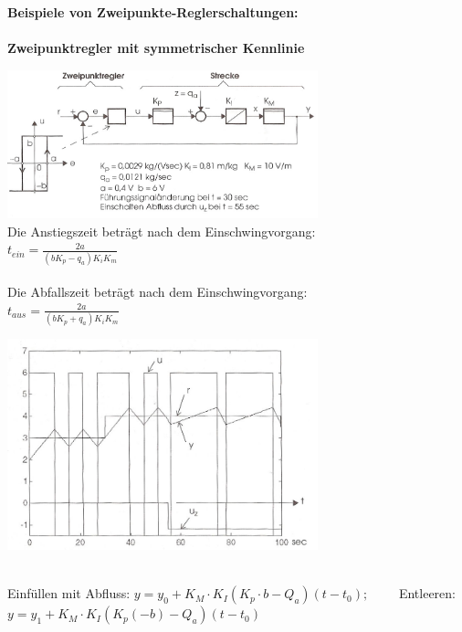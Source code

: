 	\textbf{Beispiele von Zweipunkte-Reglerschaltungen:}\\ \\
		\textbf{Zweipunktregler mit symmetrischer Kennlinie } \\
		\begin{minipage}{9cm}
			\vspace{.5cm}        
	 		\includegraphics[width=9cm]{./bilder/Zweipunktregler-b+b2.jpg}\\
			Die Anstiegszeit beträgt nach dem Einschwingvorgang:\\
			$t_{ein}=\frac{2a}{(b K_p - q_a)K_i K_m}$ \\ \\
			Die Abfallszeit beträgt nach dem Einschwingvorgang:\\
			$t_{aus}=\frac{2a}{(b K_p + q_a)K_i K_m}$
        \end{minipage}
		\begin{minipage}{9cm}
			\vspace{.5cm}        
			\includegraphics[width=9cm]{./bilder/Zweipunktregler-b+b_dia.jpg}
        \end{minipage}\\
         Einfüllen mit Abfluss: $y = y_0 + K_M \cdot K_I(K_p \cdot b - Q_a)(t-t_0); \qquad$ 
         Entleeren: $y=y_1 + K_M \cdot K_I(K_p(-b) - Q_a)(t-t_0)$
         

